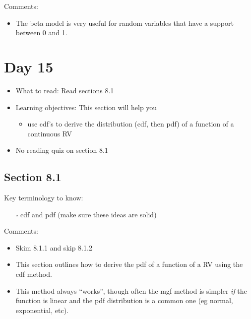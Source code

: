 \documentclass[
  letterpaper,
]{scrbook}
\providecommand{\tightlist}{%
  \setlength{\itemsep}{0pt}\setlength{\parskip}{0pt}}\usepackage{longtable,booktabs,array}
\begin{document}
Comments:

\begin{itemize}
\tightlist
\item
  The beta model is very useful for random variables that have a support
  between 0 and 1.
\end{itemize}

\section*{Day 15}\label{day-15}


\begin{itemize}
\item
  What to read: Read sections 8.1
\item
  Learning objectives: This section will help you

  \begin{itemize}
  \tightlist
  \item
    use cdf's to derive the distribution (cdf, then pdf) of a function
    of a continuous RV
  \end{itemize}
\item
  No reading quiz on section 8.1
\end{itemize}

\subsection*{Section 8.1}\label{section-8.1}

Key terminology to know:

\begin{itemize}
\tightlist
\item[$\square$]
  cdf and pdf (make sure these ideas are solid)
\end{itemize}

Comments:

\begin{itemize}
\tightlist
\item
  Skim 8.1.1 and skip 8.1.2
\item
  This section outlines how to derive the pdf of a function of a RV
  using the cdf method.
\item
  This method always ``works'', though often the mgf method is simpler
  \emph{if} the function is linear and the pdf distribution is a common
  one (eg normal, exponential, etc).
\end{itemize}
\end{document}
